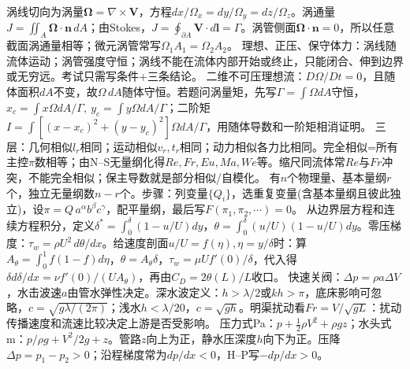 涡线切向为涡量$\bm\Omega=\nabla\times\bm V$，方程$dx/\Omega_x=dy/\Omega_y=dz/\Omega_z$。涡通量$J=\iint_A\bm\Omega\cdot\bm n\,dA$；由Stokes，$J=\oint_{\partial A}\bm V\cdot d\bm l=\Gamma$。涡管侧面$\bm\Omega\cdot\bm n=0$，所以任意截面涡通量相等；微元涡管常写$\Omega_1A_1=\Omega_2A_2$。
理想、正压、保守体力：涡线随流体运动；涡管强度守恒；涡线不能在流体内部开始或终止，只能闭合、伸到边界或无穷远。考试只需写条件+三条结论。
二维不可压理想流：$D\Omega/Dt=0$，且随体面积$dA$不变，故$\Omega\,dA$随体守恒。若题问涡量矩，先写$\Gamma=\int\Omega dA$守恒，$x_c=\int x\Omega dA/\Gamma,\ y_c=\int y\Omega dA/\Gamma$；二阶矩$I=\int[(x-x_c)^2+(y-y_c)^2]\Omega dA/\Gamma$，用随体导数和一阶矩相消证明。
三层：几何相似$l_r$相同；运动相似$v_r,t_r$相同；动力相似各力比相同。完全相似=所有主控$\pi$数相等；由N--S无量纲化得$Re,Fr,Eu,Ma,We$等。缩尺同流体常$Re$与$Fr$冲突，不能完全相似；保主导数就是部分相似/自模化。
有$n$个物理量、基本量纲$r$个，独立无量纲数$n-r$个。步骤：列变量$\{Q_i\}$，选重复变量(含基本量纲且彼此独立)，设$\pi=Q\,a^\alpha b^\beta c^\gamma$，配平量纲，最后写$F(\pi_1,\pi_2,\cdots)=0$。
从边界层方程和连续方程积分，定义$\delta^*=\int_0^\delta(1-u/U)dy$，$\theta=\int_0^\delta(u/U)(1-u/U)dy$。零压梯度：$\tau_w=\rho U^2\,d\theta/dx$。给速度剖面$u/U=f(\eta),\eta=y/\delta$时：算$A_\theta=\int_0^1f(1-f)d\eta$，$\theta=A_\theta\delta$，$\tau_w=\mu U f'(0)/\delta$，代入得$\delta d\delta/dx=\nu f'(0)/(UA_\theta)$，再由$C_D=2\theta(L)/L$收口。
快速关阀：$\Delta p=\rho a\Delta V$，水击波速$a$由管水弹性决定。深水波定义：$h>\lambda/2$或$kh>\pi$，底床影响可忽略，$c=\sqrt{g\lambda/(2\pi)}$；浅水$h<\lambda/20$，$c=\sqrt{gh}$。明渠扰动看$Fr=V/\sqrt{gL}$：扰动传播速度和流速比较决定上游是否受影响。
压力式Pa：$p+\frac12\rho V^2+\rho gz$；水头式m：$p/\rho g+V^2/2g+z$。管路$z$向上为正，静水压深度$h$向下为正。压降$\Delta p=p_1-p_2>0$；沿程梯度常为$dp/dx<0$，H--P写$-dp/dx>0$。

